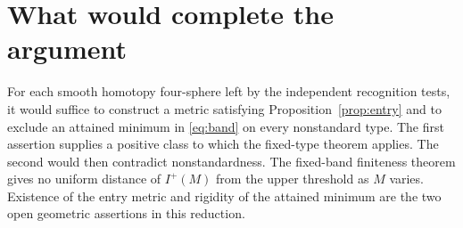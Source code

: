 \documentclass[11pt,letterpaper]{article}
\numberwithin{equation}{section}
\begin{document}




\section{What would complete the argument}\label{sec:open}

For each smooth homotopy four-sphere left by the independent recognition
tests, it would suffice to construct a metric satisfying Proposition~\ref{prop:entry} and to exclude an attained minimum in \eqref{eq:band} on every
nonstandard type. The first assertion supplies a positive class to
which the fixed-type theorem applies. The second would then contradict
nonstandardness. The fixed-band finiteness theorem gives no uniform
distance of \(I^+(M)\) from the upper threshold as \(M\) varies.
Existence of the entry metric and rigidity of the attained minimum
are the two open geometric assertions in this reduction.


\end{document}
